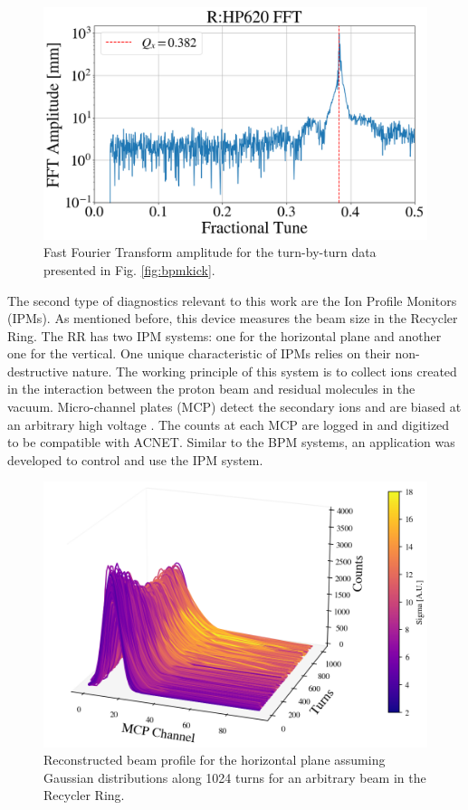 \begin{figure}[H]
   \centering
   \includegraphics[width=\columnwidth]{chapter3/bpm_fft.png}
   \caption{Fast Fourier Transform amplitude for the turn-by-turn data presented in Fig. \ref{fig:bpmkick}.}
   \label{fig:bpmfft}
   \vspace{-1.25em}
\end{figure}

The second type of diagnostics relevant to this work are the Ion Profile Monitors (IPMs). As mentioned before, this device measures the beam size in the Recycler Ring. The RR has two IPM systems: one for the horizontal plane and another one for the vertical. One unique characteristic of IPMs relies on their non-destructive nature. The working principle of this system is to collect ions created in the interaction between the proton beam and residual molecules in the vacuum. Micro-channel plates (MCP) detect the secondary ions and are biased at an arbitrary high voltage \cite{betiay}. The counts at each MCP are logged in and digitized to be compatible with ACNET. Similar to the BPM systems, an application was developed to control and use the IPM system.     

\begin{figure}[H]
   \centering
   \includegraphics[width=\columnwidth]{chapter3/ipm.png}
   \caption{Reconstructed beam profile for the horizontal plane assuming Gaussian distributions along 1024 turns for an arbitrary beam in the Recycler Ring.}
   \label{fig:ipm0}
   \vspace{-1.25em}
\end{figure}

